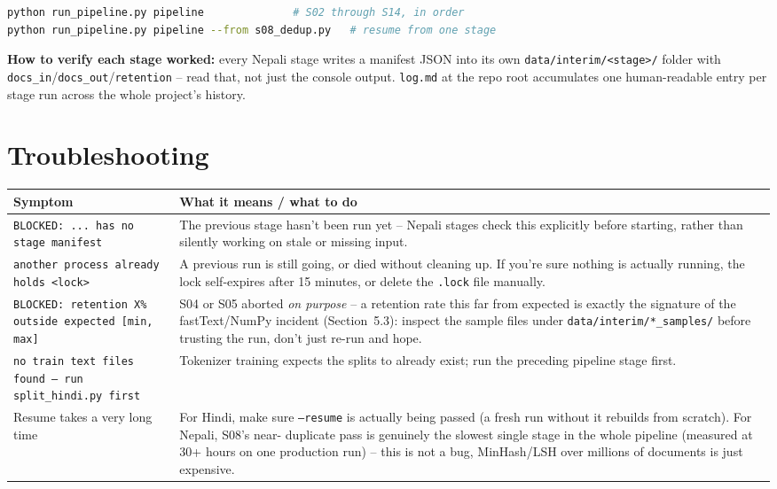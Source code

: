 \documentclass[11pt]{report}
\begin{document}
\begin{lstlisting}[language=bash]
python run_pipeline.py pipeline              # S02 through S14, in order
python run_pipeline.py pipeline --from s08_dedup.py   # resume from one stage
\end{lstlisting}

\textbf{How to verify each stage worked:} every Nepali stage writes a
manifest JSON into its own \texttt{data/interim/<stage>/} folder with
\texttt{docs\_in}/\texttt{docs\_out}/\texttt{retention} -- read that, not
just the console output. \texttt{log.md} at the repo root accumulates one
human-readable entry per stage run across the whole project's history.

\section{Troubleshooting}

\begin{center}
\begin{tabular}{p{5.2cm}p{7.5cm}}
\toprule
\textbf{Symptom} & \textbf{What it means / what to do} \\
\midrule
\texttt{BLOCKED: ... has no stage manifest} &
The previous stage hasn't been run yet -- Nepali stages check this
explicitly before starting, rather than silently working on stale or
missing input. \\
\texttt{another process already holds <lock>} &
A previous run is still going, or died without cleaning up. If you're
sure nothing is actually running, the lock self-expires after 15
minutes, or delete the \texttt{.lock} file manually. \\
\texttt{BLOCKED: retention X\% outside expected [min, max]} &
S04 or S05 aborted \textit{on purpose} -- a retention rate this far from
expected is exactly the signature of the fastText/NumPy incident
(Section~5.3): inspect the sample files under
\texttt{data/interim/*\_samples/} before trusting the run, don't just
re-run and hope. \\
\texttt{no train text files found -- run split\_hindi.py first} &
Tokenizer training expects the splits to already exist; run the
preceding pipeline stage first. \\
Resume takes a very long time &
For Hindi, make sure \texttt{--resume} is actually being passed (a
fresh run without it rebuilds from scratch). For Nepali, S08's near-
duplicate pass is genuinely the slowest single stage in the whole
pipeline (measured at 30+ hours on one production run) -- this is not a
bug, MinHash/LSH over millions of documents is just expensive. \\
\bottomrule
\end{tabular}
\end{center}
\end{document}

